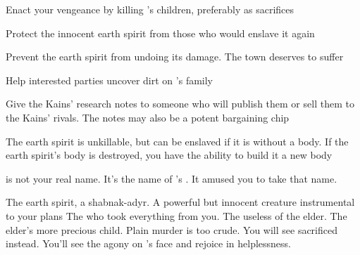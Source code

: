 \documentclass[char]{Pestilence}
\begin{document}
\begin{itemz}[Goals]
	\item Enact your vengeance by killing \cElder{}'s children, preferably as sacrifices
	\item Protect the innocent earth spirit from those who would enslave it again
	\item Prevent the earth spirit from undoing its damage. The town deserves to suffer
	\item Help interested parties uncover dirt on \cElder{}'s family
	\item Give the Kains' research notes to someone who will publish them or sell them to the Kains' rivals. The notes may also be a potent bargaining chip

\end{itemz}

\begin{itemz}[Notes]
	\item The earth spirit is unkillable, but can be enslaved if it is without a body. If the earth spirit's body is destroyed, you have the ability to build it a new body
	\item \cShaman{} is not your real name. It's the name of \cElder{\intro}'s \cElderSpouse{\spouse}. It amused you to take that name. 
\end{itemz}

\begin{contacts}
	\contact{\cPlaguebearer{}} The earth spirit, a shabnak-adyr. A powerful but innocent creature instrumental to your plans
	\contact{\cElder{}} The \cElder{\human} who took everything from you. 
	\contact{\cApprentice{}} The useless \cApprentice{\offspring} of the elder.
	\contact{\cRebel{}} The elder's more precious child. Plain murder is too crude. You will see \cRebel{\them} sacrificed instead. You'll see the agony on \cElder{}'s face and rejoice in \cElder{\their} helplessness.
\end{contacts}
\end{document}
